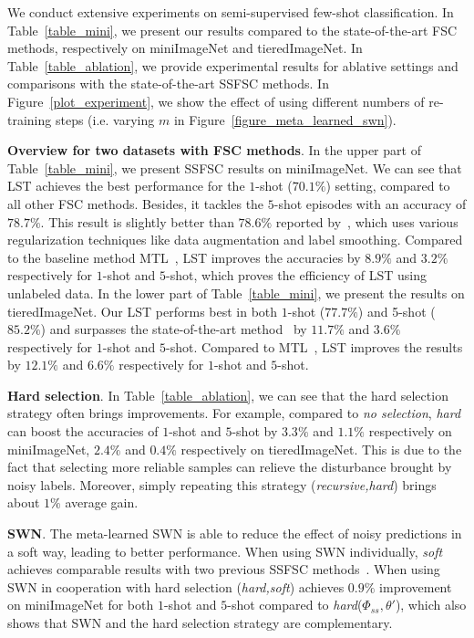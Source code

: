\documentclass{article}
\newcommand{\myparagraph}[1]{\vspace{0.1em}\noindent\textbf{#1}}
\begin{document}
We conduct extensive experiments on semi-supervised few-shot classification. In Table~\ref{table_mini}, we present our results compared to the state-of-the-art FSC methods, respectively on miniImageNet and tieredImageNet. In Table~\ref{table_ablation}, we provide experimental results for ablative settings and comparisons with the state-of-the-art SSFSC methods. In Figure~\ref{plot_experiment}, we show the effect of using different numbers of re-training steps (i.e. varying $m$ in Figure~\ref{figure_meta_learned_swn}).

\myparagraph{Overview for two datasets with FSC methods}. 
In the upper part of Table~\ref{table_mini}, we present SSFSC results on miniImageNet. We can see that LST achieves the best performance for the $1$-shot ($70.1\%$) setting, compared to all other FSC methods. Besides, it tackles the $5$-shot episodes with an accuracy of $78.7\%$. This result is slightly better than $78.6\%$ reported by~\cite{LeeCVPR19svm}, which uses various regularization techniques like data augmentation and label smoothing.
Compared to the baseline method MTL~\cite{SunCVPR2019}, LST improves the accuracies by $8.9\%$ and $3.2\%$ respectively for $1$-shot and $5$-shot, which proves the efficiency of LST using unlabeled data. In the lower part of Table~\ref{table_mini}, we present the results on tieredImageNet. Our LST performs best in both $1$-shot ($77.7\%$) and 5-shot ($85.2\%$) and surpasses the state-of-the-art method~\cite{LeeCVPR19svm} by $11.7\%$ and $3.6\%$ respectively for $1$-shot and $5$-shot. 
Compared to MTL~\cite{SunCVPR2019}, LST improves the results by $12.1\%$ and $6.6\%$ respectively for $1$-shot and $5$-shot.

\myparagraph{Hard selection}. In Table~\ref{table_ablation}, we can see that the hard selection strategy often brings improvements. For example, compared to \emph{no selection}, \emph{hard} can boost the accuracies of $1$-shot and $5$-shot by $3.3\%$ and $1.1\%$ respectively on miniImageNet, $2.4\%$ and $0.4\%$ respectively on tieredImageNet. This is due to the fact that selecting more reliable samples can relieve the disturbance brought by noisy labels. 
Moreover, simply repeating this strategy (\emph{recursive,hard}) brings about $1\%$ average gain.


\myparagraph{SWN}. The meta-learned SWN is able to reduce the effect of noisy predictions in a soft way, leading to better performance. When using SWN individually, \emph{soft} achieves comparable results with two previous SSFSC methods~\cite{RenICLR2018_semisupervised, LiuICLR2019transductive}. When using SWN in cooperation with hard selection (\emph{hard,soft}) achieves $0.9\%$ improvement on miniImageNet for both $1$-shot and $5$-shot compared to \emph{hard}($\Phi_{ss}, \theta'$), which also shows that SWN and the hard selection strategy are complementary.
\end{document}

